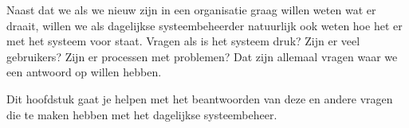 Naast dat we als we nieuw zijn in een organisatie graag willen weten wat er draait, willen we als dagelijkse systeembeheerder natuurlijk ook weten hoe het er met het systeem voor staat. Vragen als is het systeem druk? Zijn er veel gebruikers? Zijn er processen met problemen? Dat zijn allemaal vragen waar we een antwoord op willen hebben.

Dit hoofdstuk gaat je helpen met het beantwoorden van deze en andere vragen die te maken hebben met het dagelijkse systeembeheer.

